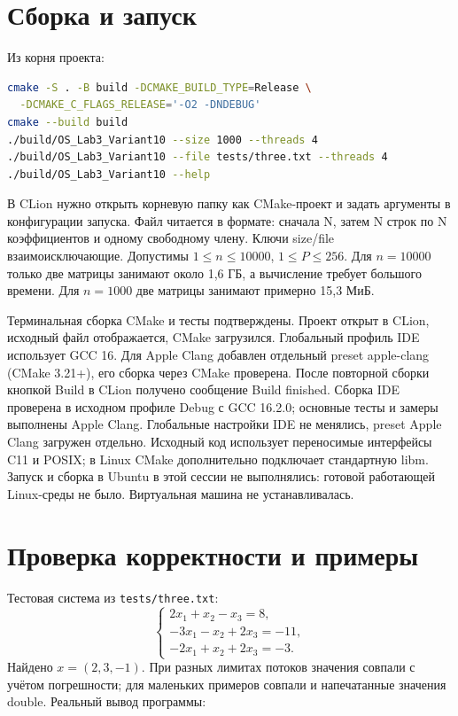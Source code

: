 \section{Сборка и запуск}
Из корня проекта:
\begin{lstlisting}[language=bash,numbers=none,basicstyle=\small\ttfamily]
cmake -S . -B build -DCMAKE_BUILD_TYPE=Release \
  -DCMAKE_C_FLAGS_RELEASE='-O2 -DNDEBUG'
cmake --build build
./build/OS_Lab3_Variant10 --size 1000 --threads 4
./build/OS_Lab3_Variant10 --file tests/three.txt --threads 4
./build/OS_Lab3_Variant10 --help
\end{lstlisting}
В CLion нужно открыть корневую папку как CMake-проект и задать аргументы
в конфигурации запуска. Файл читается в формате: сначала N, затем N строк
по N коэффициентов и одному свободному члену. Ключи size/file взаимоисключающие.
Допустимы $1\le n\le10000$, $1\le P\le256$. Для $n=10000$ только две
матрицы занимают около 1,6 ГБ, а вычисление требует большого времени.
Для $n=1000$ две матрицы занимают примерно 15,3 МиБ.

Терминальная сборка CMake и тесты подтверждены. Проект открыт в CLion, исходный файл отображается, CMake загрузился.
Глобальный профиль IDE использует GCC 16. Для Apple Clang добавлен отдельный
preset apple-clang (CMake 3.21+), его сборка через CMake проверена.
После повторной сборки кнопкой Build в CLion получено сообщение
Build finished. Сборка IDE проверена в исходном профиле Debug с GCC 16.2.0;
основные тесты и замеры выполнены Apple Clang. Глобальные настройки IDE
не менялись, preset Apple Clang загружен отдельно.
Исходный код использует переносимые интерфейсы C11 и POSIX; в Linux CMake
дополнительно подключает стандартную libm. Запуск и сборка в Ubuntu в этой
сессии не выполнялись: готовой работающей Linux-среды не было. Виртуальная
машина не устанавливалась.

\section{Проверка корректности и примеры}
Тестовая система из \texttt{tests/three.txt}:
\[
\begin{cases}
2x_1+x_2-x_3=8,\\
-3x_1-x_2+2x_3=-11,\\
-2x_1+x_2+2x_3=-3.
\end{cases}
\]
Найдено $x=(2,3,-1)$. При разных лимитах потоков значения совпали с учётом
погрешности; для маленьких примеров совпали и напечатанные значения double.
Реальный вывод программы:
\par\medskip
\begin{minipage}{\textwidth}

\end{minipage}
\par\medskip

